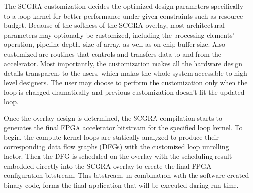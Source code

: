 The SCGRA customization decides the optimized design parameters specifically to a loop kernel for
better performance under given constraints such as resource budget. Because of the softness of the
SCGRA overlay, most architectural parameters may optionally be customized, including the processing
elements' operation, pipeline depth, size of array, as well as on-chip buffer size. Also customized
are routines that controls and transfers data to and from the accelerator. Most importantly, the
customization makes all the hardware design details transparent to the users, which makes the whole system
accessible to high-level designers. The user may choose to perform the customization only when the
loop is changed dramatically and previous customization doesn't fit the updated loop.

Once the overlay design is determined, the SCGRA compilation starts to generates the final FPGA
accelerator bitstream for the specified loop kernel. To begin, the compute kernel loops are
statically analyzed to produce their corresponding data flow graphs (DFGs) with the customized loop
unrolling factor. Then the DFG is scheduled on the overlay with the scheduling result embedded
directly into the SCGRA overlay to create the final FPGA configuration bitstream. This bitstream, in
combination with the software created binary code, forms the final application that will be executed
during run time.



